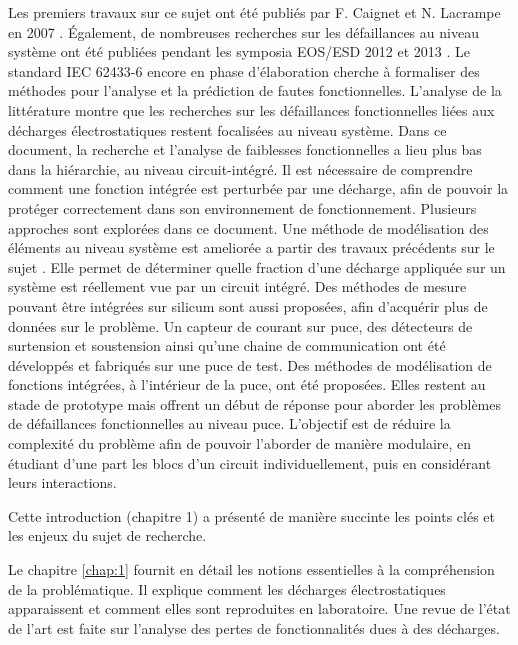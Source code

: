 Les premiers travaux sur ce sujet ont été publiés par F. Caignet et N. Lacrampe en 2007 \cite{LacrampeTransientImmunity}.
Également, de nombreuses recherches sur les défaillances au niveau système ont été publiées pendant les symposia EOS/ESD 2012 \cite{soft-error-esd-1,SDRAMCase,mixedModeESDSims} et 2013 \cite{softFailSubsystem, powered-tlp-soft-fail}.
Le standard IEC 62433-6 \cite{iec62433-6} encore en phase d'élaboration cherche à formaliser des méthodes pour l'analyse et la prédiction de fautes fonctionnelles.
L'analyse de la littérature montre que les recherches sur les défaillances fonctionnelles liées aux décharges électrostatiques restent focalisées au niveau système.
Dans ce document, la recherche et l'analyse de faiblesses fonctionnelles a lieu plus bas dans la hiérarchie, au niveau circuit-intégré.
Il est nécessaire de comprendre comment une fonction intégrée est perturbée par une décharge, afin de pouvoir la protéger correctement dans son environnement de fonctionnement.
Plusieurs approches sont explorées dans ce document.
Une méthode de modélisation des éléments au niveau système est ameliorée a partir des travaux précédents sur le sujet \cite{phd-lacrampe, phd-monnereau}.
Elle permet de déterminer quelle fraction d'une décharge appliquée sur un système est réellement vue par un circuit intégré.
Des méthodes de mesure pouvant être intégrées sur silicum sont aussi proposées, afin d'acquérir plus de données sur le problème.
Un capteur de courant sur puce, des détecteurs de surtension et soustension ainsi qu'une chaine de communication ont été développés et fabriqués sur une puce de test.
Des méthodes de modélisation de fonctions intégrées, à l'intérieur de la puce, ont été proposées.
Elles restent au stade de prototype mais offrent un début de réponse pour aborder les problèmes de défaillances fonctionnelles au niveau puce.
L'objectif est de réduire la complexité du problème afin de pouvoir l'aborder de manière modulaire, en étudiant d'une part les blocs d'un circuit individuellement, puis en considérant leurs interactions.

%
Cette introduction (chapitre 1) a présenté de manière succinte les points clés et les enjeux du sujet de recherche.

Le chapitre \ref{chap:1} fournit en détail les notions essentielles à la compréhension de la problématique.
Il explique comment les décharges électrostatiques apparaissent et comment elles sont reproduites en laboratoire.
Une revue de l'état de l'art est faite sur l'analyse des pertes de fonctionnalités dues à des décharges.

